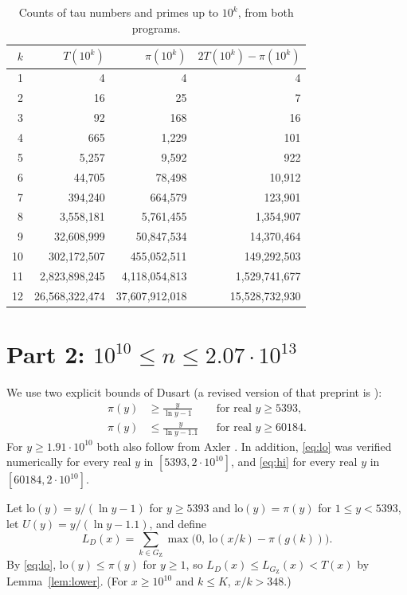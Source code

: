 \documentclass[11pt]{article}
\theoremstyle{remark}
\newcommand{\GZ}{G_{\mathrm{Z}}}
\begin{document}
\begin{table}[ht]
\centering
\begin{tabular}{rrrr}
\toprule
$k$ & $T(10^k)$ & $\pi(10^k)$ & $2T(10^k) - \pi(10^k)$ \\
\midrule
1 & 4 & 4 & 4 \\
2 & 16 & 25 & 7 \\
3 & 92 & 168 & 16 \\
4 & 665 & 1{,}229 & 101 \\
5 & 5{,}257 & 9{,}592 & 922 \\
6 & 44{,}705 & 78{,}498 & 10{,}912 \\
7 & 394{,}240 & 664{,}579 & 123{,}901 \\
8 & 3{,}558{,}181 & 5{,}761{,}455 & 1{,}354{,}907 \\
9 & 32{,}608{,}999 & 50{,}847{,}534 & 14{,}370{,}464 \\
10 & 302{,}172{,}507 & 455{,}052{,}511 & 149{,}292{,}503 \\
11 & 2{,}823{,}898{,}245 & 4{,}118{,}054{,}813 & 1{,}529{,}741{,}677 \\
12 & 26{,}568{,}322{,}474 & 37{,}607{,}912{,}018 & 15{,}528{,}732{,}930 \\
\bottomrule
\end{tabular}
\caption{Counts of tau numbers and primes up to $10^k$, from both programs.}\label{tab:counts}
\end{table}

\section{Part 2: \texorpdfstring{$10^{10} \le n \le 2.07\cdot 10^{13}$}{10^10 <= n <= 2.07*10^13}}\label{sec:part2}

We use two explicit bounds of Dusart \cite[Theorem~6.9, (6.6)]{Du10} (a revised version of that preprint is \cite{Du18}):
\begin{align}
\pi(y) &\ge \frac{y}{\ln y - 1} && \text{for real } y \ge 5393, \label{eq:lo}\\
\pi(y) &\le \frac{y}{\ln y - 1.1} && \text{for real } y \ge 60184. \label{eq:hi}
\end{align}
For $y \ge 1.91\cdot 10^{10}$ both also follow from Axler \cite[Theorems~1.2 and~1.3]{Ax}. In addition, \eqref{eq:lo} was verified numerically for every real $y$ in $[5393, 2\cdot 10^{10}]$, and \eqref{eq:hi} for every real $y$ in $[60184, 2\cdot 10^{10}]$.

Let $\mathrm{lo}(y) = y/(\ln y - 1)$ for $y \ge 5393$ and $\mathrm{lo}(y) = \pi(y)$ for $1 \le y < 5393$, let $U(y) = y/(\ln y - 1.1)$, and define
\[
L_D(x) = \sum_{k \in \GZ} \max\bigl(0,\ \mathrm{lo}(x/k) - \pi(g(k))\bigr).
\]
By \eqref{eq:lo}, $\mathrm{lo}(y) \le \pi(y)$ for $y \ge 1$, so $L_D(x) \le L_{\GZ}(x) < T(x)$ by Lemma~\ref{lem:lower}. (For $x \ge 10^{10}$ and $k \le K$, $x/k > 348$.)
\end{document}
